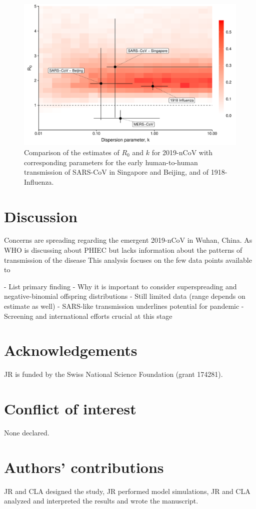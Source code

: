 \documentclass{article}
\begin{document}
\begin{figure}[h]
	\centering
	\includegraphics[width=.9\linewidth]{../figure/fig1.pdf}
	\caption{ Comparison of the estimates of $R_0$ and $k$ for 2019-nCoV with corresponding parameters for the early human-to-human transmission of SARS-CoV in Singapore and Beijing, and of 1918-Influenza.\cite{Lloyd-Smith:2005,Fraser:2011,Kucharski:2015b}
	}
	\label{fig:fig1}
\end{figure}


\section{Discussion}

Concerns are spreading regarding the emergent 2019-nCoV in Wuhan, China.
As WHO is discussing about PHIEC but lacks information about the patterns of transmission of the disease
This analysis focuses on the few data points available to


- List primary finding
- Why it is important to consider superspreading and negative-binomial offspring distributions
- Still limited data (range depends on estimate as well)
- SARS-like transmission underlines potential for pandemic
- Screening and international efforts crucial at this stage


\section{Acknowledgements}
JR is funded by the Swiss National Science Foundation (grant 174281).
\section{Conflict of interest}
None declared.

\section{Authors' contributions}

JR and CLA designed the study, JR performed model simulations, JR and CLA analyzed and interpreted the results and wrote the manuscript.


  
\end{document}
